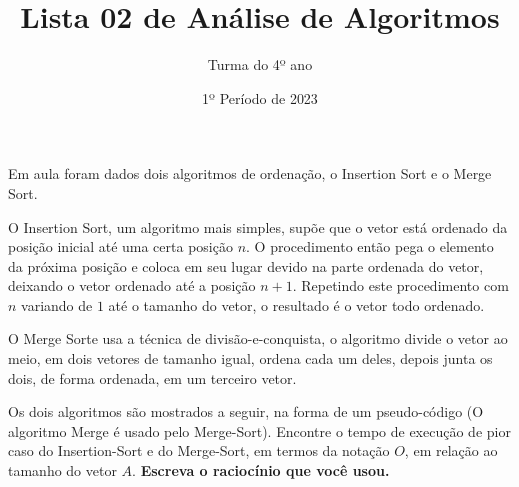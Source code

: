 \documentclass[12pt]{article}
\title{Lista 02 de Análise de Algoritmos}
\date{1º Período de 2023}
\author{Turma do 4º ano}
\begin{document}
\maketitle


\vspace{3em}

Em aula foram dados dois algoritmos de ordenação, o Insertion Sort e o Merge Sort. 

O Insertion Sort, um algoritmo mais simples, supõe que o vetor está ordenado da posição inicial até uma certa posição $n$. O procedimento então pega o elemento da próxima posição e coloca em seu lugar devido na parte ordenada do vetor, deixando o vetor ordenado até a posição $n+1$.
Repetindo este procedimento com $n$ variando de $1$ até o tamanho do vetor, o resultado é o vetor todo ordenado.

O Merge Sorte usa a técnica de divisão-e-conquista, o algoritmo divide o vetor ao meio, em dois vetores de tamanho igual, ordena cada um deles, depois junta os dois, de forma ordenada, em um terceiro vetor.

Os dois algoritmos são mostrados a seguir, na forma de um pseudo-código (O algoritmo Merge é usado pelo Merge-Sort).
Encontre o tempo de execução de pior caso do Insertion-Sort e do Merge-Sort, em termos da notação $O$, em relação ao tamanho do vetor $A$. \textbf{Escreva o raciocínio que você usou.}







\end{document}
